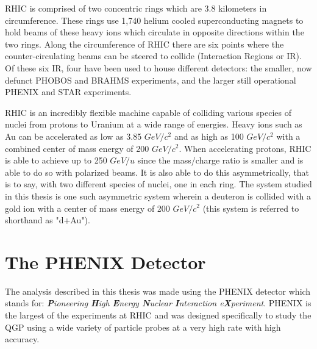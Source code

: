 RHIC is comprised of two concentric rings which are 3.8 kilometers in circumference.  These rings use 1,740 helium cooled superconducting magnets to hold beams of these heavy ions which circulate in opposite directions within the two rings.  Along the circumference of RHIC there are six points where the counter-circulating beams can be steered to collide (Interaction Regions or IR). Of these six IR, four have been used to house different detectors: the smaller, now defunct PHOBOS and BRAHMS experiments, and the larger still operational PHENIX and STAR experiments.  

RHIC is an incredibly flexible machine capable of colliding various species of nuclei from protons to Uranium \citep{EBISupgrade} at a wide range of energies.  Heavy ions such as Au can be accelerated as low as 3.85 $GeV/c^{2}$ and as high as 100 $GeV/c^{2}$ \citep{RHIClum} with a combined center of mass energy of 200 $GeV/c^{2}$.  When accelerating protons, RHIC is able to achieve up to 250 $GeV/u$ since the mass/charge ratio is smaller and is able to do so with polarized beams. It is also able to do this asymmetrically, that is to say, with two different species of nuclei, one in each ring.  The system studied in this thesis is one such asymmetric system wherein a deuteron is collided with a gold ion with a center of mass energy of 200 $GeV/c^{2}$ (this system is referred to shorthand as "d+Au").

\section{The PHENIX Detector}

\indent The analysis described in this thesis was made using the PHENIX detector which stands for: \textit{\textbf{P}ioneering \textbf{H}igh \textbf{E}nergy \textbf{N}uclear \textbf{I}nteraction e\textbf{X}periment}. PHENIX is the largest of the experiments at RHIC and was designed specifically to study the QGP using a wide variety of particle probes at a very high rate with high accuracy.  

